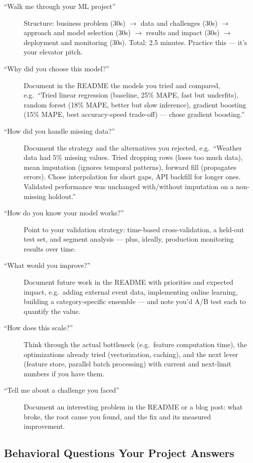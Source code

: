 \begin{description}
  \item[``Walk me through your ML project''] Structure: business problem (30s) $\rightarrow$ data and challenges
  (30s) $\rightarrow$ approach and model selection (30s) $\rightarrow$ results and impact (30s) $\rightarrow$
  deployment and monitoring (30s). Total: 2.5 minutes. Practice this --- it's your elevator pitch.
  \item[``Why did you choose this model?''] Document in the README the models you tried and compared, e.g.\
  ``Tried linear regression (baseline, 25\% MAPE, fast but underfits), random forest (18\% MAPE, better but slow
  inference), gradient boosting (15\% MAPE, best accuracy-speed trade-off) --- chose gradient boosting.''
  \item[``How did you handle missing data?''] Document the strategy and the alternatives you rejected, e.g.\
  ``Weather data had 5\% missing values. Tried dropping rows (loses too much data), mean imputation (ignores
  temporal patterns), forward fill (propagates errors). Chose interpolation for short gaps, API backfill for
  longer ones. Validated performance was unchanged with/without imputation on a non-missing holdout.''
  \item[``How do you know your model works?''] Point to your validation strategy: time-based cross-validation,
  a held-out test set, and segment analysis --- plus, ideally, production monitoring results over time.
  \item[``What would you improve?''] Document future work in the README with priorities and expected impact,
  e.g.\ adding external event data, implementing online learning, building a category-specific ensemble --- and
  note you'd A/B test each to quantify the value.
  \item[``How does this scale?''] Think through the actual bottleneck (e.g.\ feature computation time), the
  optimizations already tried (vectorization, caching), and the next lever (feature store, parallel batch
  processing) with current and next-limit numbers if you have them.
  \item[``Tell me about a challenge you faced''] Document an interesting problem in the README or a blog post:
  what broke, the root cause you found, and the fix and its measured improvement.
\end{description}

\subsection{Behavioral Questions Your Project Answers}

